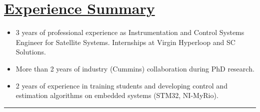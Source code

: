 \section*{\underline{Experience Summary}}
\begin{itemize}
        \item 3 years of professional experience as Instrumentation and Control Systems Engineer for Satellite Systems. Internships at Virgin Hyperloop and SC Solutions.
        \item More than 2 years of industry (Cummins) collaboration during PhD research.
        \item 2 years of experience in training students and developing control and estimation algorithms on embedded systems (STM32, NI-MyRio).
\end{itemize}

\noindent\rule{\textwidth}{0.4pt}
